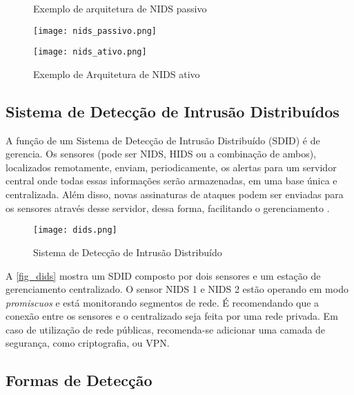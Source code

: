 
\begin{figure}[!htb]
 \label{fig_nids-arquitetura}
 \centering
 \begin{minipage}{0.4\textwidth}
  \centering
  \caption{Exemplo de arquitetura de NIDS passivo} \label{fig_nids-passivo}
  \texttt{[image: nids\_passivo.png]}
 \end{minipage}
 \hfill
 \begin{minipage}{0.4\textwidth}
  \centering
  \caption{Exemplo de Arquitetura de NIDS ativo} \label{fig_nids-ativo}
  \texttt{[image: nids\_ativo.png]}
 \end{minipage}
\end{figure}

\subsection{Sistema de Detecção de Intrusão Distribuídos}

A função de um Sistema de Detecção de Intrusão Distribuído (SDID) é de gerencia. Os sensores (pode ser NIDS, HIDS ou a combinação de ambos), localizados remotamente, enviam, periodicamente, os alertas para um servidor central onde todas essas informações serão armazenadas, em uma base única e centralizada. Além disso, novas assinaturas de ataques podem ser enviadas para os sensores através desse servidor, dessa forma, facilitando o gerenciamento \cite{snort:andrew}.

\begin{figure}[!htb]
  \centering
  \caption{Sistema de Detecção de Intrusão Distribuído} \label{fig_dids}
  \texttt{[image: dids.png]}
\end{figure}

A \autoref{fig_dids} mostra um SDID composto por dois sensores e um estação de gerenciamento centralizado. O sensor NIDS 1 e NIDS 2 estão operando em modo \textit{promiscuos} e está monitorando segmentos de rede. É recomendando que a conexão entre os sensores e o centralizado seja feita por uma rede privada. Em caso de utilização de rede públicas, recomenda-se adicionar uma camada de segurança, como criptografia, ou VPN.

\subsection{Formas de Detecção} \label{sec:idps-formas}

